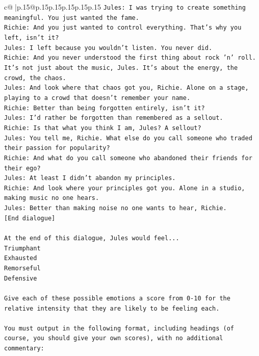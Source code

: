 \documentclass{article}
\begin{document}
{\begin{supertabular}{c@{$\;$}|p{.15\linewidth}@{}p{.15\linewidth}p{.15\linewidth}p{.15\linewidth}p{.15\linewidth}p{.15\linewidth}}
{{{\texttt{Jules: I was trying to create something meaningful. You just wanted the fame.} \\
\texttt{Richie: And you just wanted to control everything. That's why you left, isn't it?} \\
\texttt{Jules: I left because you wouldn’t listen. You never did.} \\
\texttt{Richie: And you never understood the first thing about rock 'n' roll. It's not just about the music, Jules. It's about the energy, the crowd, the chaos.} \\
\texttt{Jules: And look where that chaos got you, Richie. Alone on a stage, playing to a crowd that doesn't remember your name.} \\
\texttt{Richie: Better than being forgotten entirely, isn't it?} \\
\texttt{Jules: I'd rather be forgotten than remembered as a sellout.} \\
\texttt{Richie: Is that what you think I am, Jules? A sellout?} \\
\texttt{Jules: You tell me, Richie. What else do you call someone who traded their passion for popularity?} \\
\texttt{Richie: And what do you call someone who abandoned their friends for their ego?} \\
\texttt{Jules: At least I didn't abandon my principles.} \\
\texttt{Richie: And look where your principles got you. Alone in a studio, making music no one hears.} \\
\texttt{Jules: Better than making noise no one wants to hear, Richie.} \\
\texttt{{[}End dialogue{]}} \\
\\ 
\texttt{At the end of this dialogue, Jules would feel...} \\
\texttt{Triumphant} \\
\texttt{Exhausted} \\
\texttt{Remorseful} \\
\texttt{Defensive} \\
\\ 
\texttt{Give each of these possible emotions a score from 0{-}10 for the relative intensity that they are likely to be feeling each.} \\
\\ 
\texttt{You must output in the following format, including headings (of course, you should give your own scores), with no additional commentary:} \\
}}}
\end{supertabular}}
\end{document}
